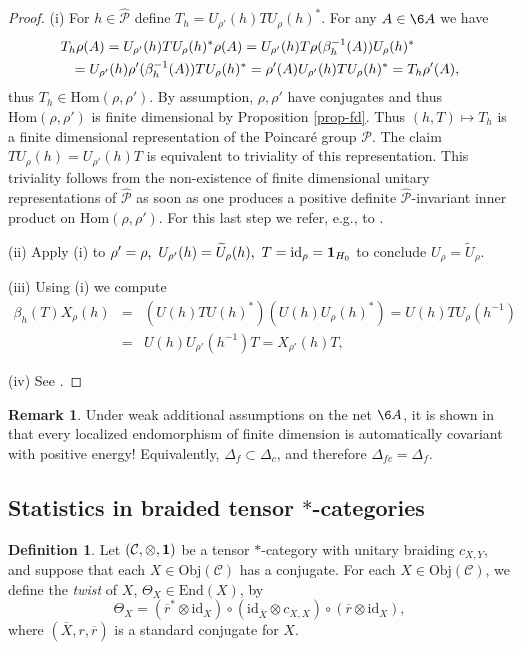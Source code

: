\documentclass[11pt]{article}
\theoremstyle{definition}
\theoremstyle{definition}
\newtheorem{defn}[thm]{Definition}
\newtheorem{note}[thm]{Remark}
\theoremstyle{remark}
\newcommand{\Obj}{\mathrm{Obj}}
\def\2#1{{\mathcal #1}}
\def\1#1{{\bf #1}}
\def\ol#1{{\overline #1}}
\newcommand{\Hom}{\mathrm{Hom}}
\newcommand{\End}{\mathrm{End}}
\def\id{\mathrm{id}}
\begin{document}
\begin{proof} (i) For $h\in\widehat{\2P}$ define $T_h=U_{\rho'}(h)TU_\rho(h)^*$. For any $A\in\6A$
we have 
\begin{eqnarray*} \lefteqn{  T_h\rho(A) = U_{\rho'}(h)TU_\rho(h)^*\rho(A)
   = U_{\rho'}(h)T\rho(\beta_h^{-1}(A))U_\rho(h)^* } \\
   &&=U_{\rho'}(h)\rho'(\beta_h^{-1}(A))TU_\rho(h)^*=\rho'(A)U_{\rho'}(h)TU_\rho(h)^*=T_h\rho'(A), 
\end{eqnarray*}
thus $T_h\in\Hom(\rho,\rho')$. By assumption, $\rho,\rho'$ have conjugates and thus
$\Hom(\rho,\rho')$ is finite dimensional by Proposition \ref{prop-fd}. Thus $(h,T)\mapsto T_h$ is a
finite dimensional representation of the Poincar\'e group $\2P$. The claim
$TU_\rho(h)=U_{\rho'}(h)T$ is equivalent to triviality of this representation. This triviality
follows from the non-existence of finite dimensional unitary representations of $\widehat{\2P}$ as
soon as one produces a positive definite $\widehat{\2P}$-invariant inner product on
$\Hom(\rho,\rho')$. For this last step we refer, e.g., to \cite{rob-lec}. 

(ii) Apply (i) to $\rho'=\rho,\ U_{\rho'}(h)=\widetilde{U}_\rho(h),\ T=\id_\rho=\11_{H_0}$ to conclude
$U_\rho=\widetilde{U}_\rho$. 

(iii) Using (i) we compute
\begin{eqnarray*} \beta_h(T)X_\rho(h) &=& (U(h)TU(h)^*)(U(h)U_\rho(h)^*)=U(h)TU_\rho(h^{-1}) \\
   &=& U(h)U_{\rho'}(h^{-1})T=X_{\rho'}(h)T, \end{eqnarray*}

(iv) See \cite{rob-lec}.
\end{proof}

\begin{note}  \label{note-cov2}
Under weak additional assumptions on the net $\6A$, it is shown in \cite[Theorem 5.2]{guido-longo}
that every localized endomorphism of finite dimension is automatically covariant with positive
energy! Equivalently, $\Delta_f\subset\Delta_c$, and therefore $\Delta_{fc}=\Delta_f$.
\end{note}


\subsection{Statistics in braided tensor $*$-categories} \label{cat-stats}

\begin{defn} Let $(\2C ,\otimes ,\11 )$ be a tensor
  $*$-category with unitary braiding $c_{X,Y}$, and
  suppose that each $X\in \Obj (\2C )$ has a conjugate.
  For each $X\in \Obj (\2C )$, we define the
  \emph{twist} of $X$, $\Theta _X\in \End (X)$, by
$$ \Theta _X = (\ol r^*\otimes \id _X)\circ (\id _{\ol X}\otimes c_{X,X})\circ
(\ol r\otimes \id _{X} ) ,$$ where $(\ol X,r,\ol r)$ is
a standard conjugate for $X$.
\end{defn}
\end{document}
